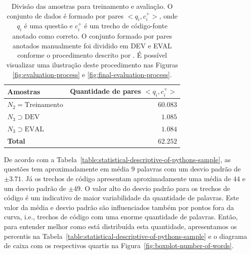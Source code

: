 \begin{table}[h]
\centering
\begin{tabular}{ p{5cm} r  }
 \hline
 \textbf{Amostras} & \textbf{Quantidade de pares $<q_{i}, c_{i}^{+}>$}\\
 \hline
 $N_{2} = \text{Treinamento}$ & $60.083$\\
 
 $N_{3} \supset \text{DEV}$ & $1.085$ \\
 
 $N_{3} \supset \text{EVAL}$ & $1.084$\\
 \hline
 \textbf{Total} & $\bm{62.252}$\\
 \hline
\end{tabular}
\caption{Divisão das amostras para treinamento e avaliação. O conjunto de dados é formado por pares $<q_{i}, c_{i}^{+}>$, onde $q_{i}$ é uma questão e $c_{i}^{+}$ é um trecho de código-fonte anotado como correto. O conjunto formado por pares anotados manualmente foi dividido em DEV e EVAL conforme o procedimento descrito por \cite{iyer-etal-2016-summarizing}. É possível visualizar uma ilustração deste procedimento nas Figuras \ref{fig:evaluation-process} e \ref{fig:final-evaluation-process}.}
\label{table:divisao-amostras}
\end{table}


De acordo com a Tabela~\ref{table:statistical-descriptive-of-pythons-sample}, as questões tem aproximadamente em média $9$ palavras com um desvio padrão de $\pm 3.71$. Já os trechos de código apresentam aproximadamente uma média de $44$ e um desvio padrão de $\pm 49$. O valor alto do desvio padrão para os trechos de código é um indicativo de maior variabilidade da quantidade de palavras. Este valor da média e desvio padrão são influenciados também por pontos fora da curva, i.e., trechos de código com uma enorme quantidade de palavras. Então, para entender melhor como está distribuída esta quantidade, apresentamos os percentis na Tabela~\ref{table:statistical-descriptive-of-pythons-sample} e o diagrama de caixa com os respectivos quartis na Figura~\ref{fig:boxplot-number-of-words}.

